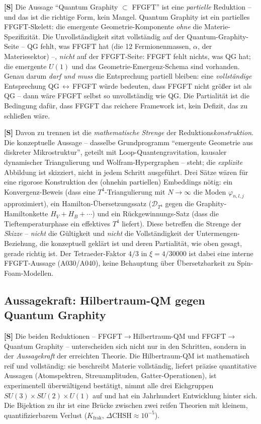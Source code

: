 \textbf{[S]} Die Aussage \enquote{Quantum Graphity $\subset$ FFGFT} ist eine
\emph{partielle} Reduktion -- und das ist die richtige Form, kein Mangel. Quantum
Graphity ist ein partielles FFGFT-Skelett: die emergente Geometrie-Komponente
\emph{ohne} die Materie-Spezifizität. Die Unvollständigkeit sitzt vollständig auf
der Quantum-Graphity-Seite -- QG fehlt, was FFGFT hat (die 12 Fermionenmassen,
$\alpha$, der Materiesektor) --, \emph{nicht} auf der FFGFT-Seite: FFGFT fehlt
nichts, was QG hat; die emergente $U(1)$ und das Geometrie-Emergenz-Schema sind
vorhanden. Genau darum \emph{darf und muss} die Entsprechung partiell bleiben:
eine \emph{vollständige} Entsprechung QG\,$\leftrightarrow$\,FFGFT würde
bedeuten, dass FFGFT nicht größer ist als QG -- dann wäre FFGFT selbst so
unvollständig wie QG. Die Partialität ist die Bedingung dafür, dass FFGFT das
reichere Framework ist, kein Defizit, das zu schließen wäre.

\textbf{[S]} Davon zu trennen ist die \emph{mathematische Strenge} der
Reduktions\emph{konstruktion}. Die konzeptuelle Aussage -- dasselbe Grundprogramm
\enquote{emergente Geometrie aus diskreter Mikrostruktur}, geteilt mit
Loop-Quantengravitation, kausaler dynamischer Triangulierung und
Wolfram-Hypergraphen -- steht; die \emph{explizite} Abbildung ist skizziert, nicht
in jedem Schritt ausgeführt. Drei Sätze wären für eine rigorose Konstruktion des
(ohnehin partiellen) Embeddings nötig: ein Konvergenz-Beweis (dass eine
$T^4$-Triangulierung mit $N\to\infty$ die Moden $\varphi_{n,l,j}$ approximiert),
ein Hamilton-Übersetzungssatz ($\mathcal D_{T^4}$ gegen die Graphity-Hamiltonkette
$H_V+H_B+\cdots$) und ein Rückgewinnungs-Satz (dass die Tieftemperaturphase ein
effektives $T^4$ liefert). Diese betreffen die Strenge der \emph{Skizze} --
\emph{nicht} die Gültigkeit und \emph{nicht} die Vollständigkeit der
Untermengen-Beziehung, die konzeptuell geklärt ist und deren Partialität, wie
oben gesagt, gerade richtig ist. Der Tetraeder-Faktor $4/3$ in $\xi = 4/30000$
ist dabei eine interne FFGFT-Aussage (A030/A040), keine Behauptung über
Übersetzbarkeit zu Spin-Foam-Modellen.

\subsection*{Aussagekraft: Hilbertraum-QM gegen Quantum Graphity}

\textbf{[S]} Die beiden Reduktionen -- FFGFT$\to$Hilbertraum-QM und
FFGFT$\to$Quantum Graphity -- unterscheiden sich nicht nur in den Schritten,
sondern in der \emph{Aussagekraft} der erreichten Theorie. Die Hilbertraum-QM ist
mathematisch reif und vollständig: sie beschreibt Materie vollständig, liefert
präzise quantitative Aussagen (Atomspektren, Streuamplituden, Gatter-Operationen),
ist experimentell überwältigend bestätigt, nimmt alle drei Eichgruppen
$SU(3)\times SU(2)\times U(1)$ auf und hat ein Jahrhundert Entwicklung hinter
sich. Die Bijektion zu ihr ist eine Brücke zwischen zwei reifen Theorien mit
kleinem, quantifizierbarem Verlust ($K_{\text{frak}}$, $\Delta\text{CHSH}\approx10^{-5}$).

